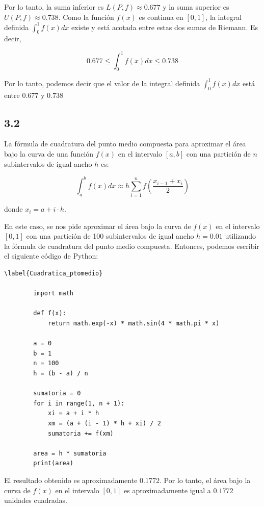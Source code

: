 \documentclass[12pt]{article}
\begin{document}
        Por lo tanto, la suma inferior es $L(P,f) \approx 0.677$ y la suma superior es $U(P,f) \approx 0.738$. Como la función $f(x)$ es continua en $[0,1]$, la integral definida $\int_0^1 f(x) dx$ existe y está acotada entre estas dos sumas de Riemann. Es decir,
          
        $$0.677 \leq \int_0^1 f(x) dx \leq 0.738$$
          
        Por lo tanto, podemos decir que el valor de la integral definida $\int_0^1 f(x) dx$ está entre $0.677$ y $0.738$

      \subsection{3.2}

      La fórmula de cuadratura del punto medio compuesta para aproximar el área bajo la curva de una función $f(x)$ en el intervalo $[a,b]$ con una partición de $n$ subintervalos de igual ancho $h$ es:

      $$\int_{a}^{b} f(x) dx \approx h \sum_{i=1}^{n} f\left(\frac{x_{i-1}+x_{i}}{2}\right)$$
      
      donde $x_i = a + i \cdot h$.
      
      En este caso, se nos pide aproximar el área bajo la curva de $f(x)$ en el intervalo $[0,1]$ con una partición de 100 subintervalos de igual ancho $h=0.01$ utilizando la fórmula de cuadratura del punto medio compuesta. Entonces, podemos escribir el siguiente código de Python:
      
      \begin{lstlisting}\label{Cuadratica_ptomedio}
        
        import math

        def f(x):
            return math.exp(-x) * math.sin(4 * math.pi * x)

        a = 0
        b = 1
        n = 100
        h = (b - a) / n

        sumatoria = 0
        for i in range(1, n + 1):
            xi = a + i * h
            xm = (a + (i - 1) * h + xi) / 2
            sumatoria += f(xm)

        area = h * sumatoria
        print(area)

      \end{lstlisting}  

      El resultado obtenido es aproximadamente 0.1772. Por lo tanto, el área bajo la curva de $f(x)$ en el intervalo $[0,1]$ es aproximadamente igual a $0.1772$ unidades cuadradas.
\end{document}

